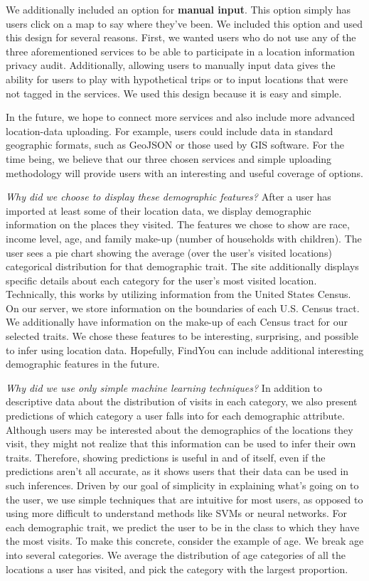 We additionally included an option for \textbf{manual input}. 
This option simply has users click on a map to say where they've been. 
We included this option and used this design for several reasons. 
First, we wanted users who do not use any of the three aforementioned services to be able to participate in a location information privacy audit. 
Additionally, allowing users to manually input data gives the ability for users to play with hypothetical trips or to input locations that were not tagged in the services. 
We used this design because it is easy and simple.

In the future, we hope to connect more services and also include more advanced location-data uploading. For example, users could include data in standard geographic formats, such as GeoJSON or those used by GIS software. For the time being, we believe that our three chosen services and simple uploading methodology will provide users with an interesting and useful coverage of options.

\emph{Why did we choose to display these demographic features?}
After a user has imported at least some of their location data, we display demographic information on the places they visited. 
The features we chose to show are race, income level, age, and family make-up (number of households with children). 
The user sees a pie chart showing the average (over the user's visited locations) categorical distribution for that demographic trait. 
The site additionally displays specific details about each category for the user's most visited location. 
Technically, this works by utilizing information from the United States Census. On our server, we store information on the boundaries of each U.S. Census tract. 
We additionally have information on the make-up of each Census tract for our selected traits.
We chose these features to be interesting, surprising, and possible to infer using location data. 
Hopefully, FindYou can include additional interesting demographic features in the future. 

\emph{Why did we use only simple machine learning techniques?}
In addition to descriptive data about the distribution of visits in each category, we also present predictions of which category a user falls into for each demographic attribute. Although users may be interested about the demographics of the locations they visit, they might not realize that this information can be used to infer their own traits. Therefore, showing predictions is useful in and of itself, even if the predictions aren't all accurate, as it shows users that their data can be used in such inferences.
Driven by our goal of simplicity in explaining what's going on to the user, we use simple techniques that are intuitive for most users, as opposed to using more difficult to understand methods like SVMs or neural networks. For each demographic trait, we predict the user to be in the class to which they have the most visits. To make this concrete, consider the example of age. We break age into several categories. 
We average the distribution of age categories of all the locations a user has visited, and pick the category with the largest proportion. 

